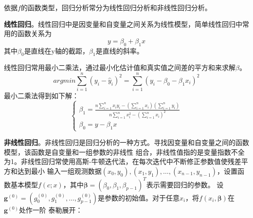 \documentclass[master]{thesis-uestc}
\begin{document}
    依据$f$的函数类型，回归分析常分为线性回归分析和非线性回归分析。

    \textbf{线性回归}。线性回归中是因变量和自变量之间关系为线性模型，简单线性回归中常用的函数关系为
\begin{equation*}
    y = \beta_0+\beta_1x
\end{equation*}
其中$\beta_0$是直线在y轴的截距，$\beta_1$是直线的斜率。

    线性回归常用最小二乘法，通过最小化估计值和真实值之间差的平方和来求解$\beta$。
\begin{equation*}
    argmin\sum_{i=1}^{n}(y_i-\hat{y}_i)^2=\sum_{i=1}^{n}(y_i-\beta_0-\beta_1x_i)^2
\end{equation*}
最小二乘法得到如下解：
\begin{equation*}
    \left\{\begin{array}{l}
        \beta_1=\frac{n \sum_{i=1}^n x_i y_i-\left(\sum_{i=1}^n x_i\right)\left(\sum_{i=1}^n y_i\right)}{n \sum_{i=1}^n x_i^2-\left(\sum_{i=1}^n x_i\right)^2} \\
        \beta_0=y-\beta_1 x
        \end{array}\right.
\end{equation*}

    \textbf{非线性回归}。非线性回归是回归分析的一种方式。寻找因变量和自变量之间的函数模型，该函数是自变量和一组参数的非线性
组合，非线性值指的是变量指数不全为1。非线性回归常使用高斯-牛顿迭代法，在每次迭代中不断修正参数值使残差平方和达到最小
输入一组观测数据${(x_0,y_0),(x_1,y_1),\ldots,(x_{n-1},y_{n-1})}$，设置函数基本模型$f(c;x)$，其中$\mathbf{\beta}=(\beta_0,\beta_1,\beta_{p-1})^T$表示需要回归的参数。
设$\mathbf{g}^{(0)}=\left(g_0^{(0)},g_1^{(0)},\ldots,g_{p-1}^{(0)}\right)$是参数的初始值。对于任意$x_i$，将$f(x_i,\mathbf{\beta})$在$\mathbf{g}^{(0)}$处作一阶
泰勒展开：
\end{document}
